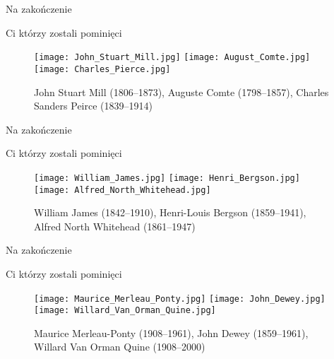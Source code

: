 \documentclass{beamer}  %
\begin{document}
\begin{frame}{Na zakończenie}

  \begin{block}{Ci którzy zostali pominięci}
    \begin{figure}
      \centering

      \texttt{[image: John\_Stuart\_Mill.jpg]}
      \texttt{[image: August\_Comte.jpg]}
      \texttt{[image: Charles\_Pierce.jpg]}

      \caption{John Stuart Mill (1806--1873), Auguste Comte
        (1798--1857), Charles Sanders Peirce (1839--1914)}
    \end{figure}
  \end{block}

\end{frame}



\begin{frame}{Na zakończenie}

  \begin{block}{Ci którzy zostali pominięci}
    \begin{figure}
      \centering

      \texttt{[image: William\_James.jpg]}
      \texttt{[image: Henri\_Bergson.jpg]}
      \texttt{[image: Alfred\_North\_Whitehead.jpg]}

      \caption{William James (1842--1910), Henri-Louis Bergson
        (1859--1941), Alfred North Whitehead (1861--1947)}
    \end{figure}
  \end{block}

\end{frame}



\begin{frame}{Na zakończenie}

  \begin{block}{Ci którzy zostali pominięci}
    \begin{figure}
      \centering

      \texttt{[image: Maurice\_Merleau\_Ponty.jpg]}
      \texttt{[image: John\_Dewey.jpg]}
      \texttt{[image: Willard\_Van\_Orman\_Quine.jpg]}

      \caption{Maurice Merleau-Ponty (1908--1961), John Dewey
        (1859--1961), Willard Van Orman Quine (1908--2000)}
    \end{figure}
  \end{block}

\end{frame}
\end{document}
